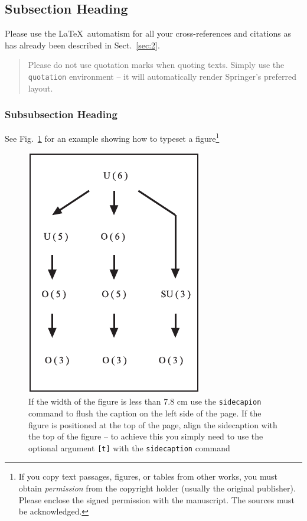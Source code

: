 \documentclass[graybox]{svmult}
\begin{document}
\subsection{Subsection Heading}
\label{subsec:2}

Please use the \LaTeX\ automatism for all your
cross-references and citations
as has already been described in Sect.~\ref{sec:2}.

\begin{quotation}
Please do not use quotation marks when quoting texts. Simply use the \verb|quotation| environment -- it will automatically render Springer's preferred layout.
\end{quotation}


\subsubsection{Subsubsection Heading}

See Fig.~\ref{fig:1} for an example showing how to typeset a figure\footnote{If you copy
text passages, figures, or tables from other works, you must obtain
\textit{permission} from the copyright holder (usually the original
publisher). Please enclose the signed permission with the manuscript. The
sources must be acknowledged.}

%
\begin{figure}[b]
\sidecaption
\includegraphics[scale=.65]{figure}
%
%
\caption{If the width of the figure is less than 7.8 cm use the \texttt{sidecapion} command to flush the caption on the left side of the page. If the figure is positioned at the top of the page, align the sidecaption with the top of the figure -- to achieve this you simply need to use the optional argument \texttt{[t]} with the \texttt{sidecaption} command}
\label{fig:1}       %
\end{figure}
\end{document}
